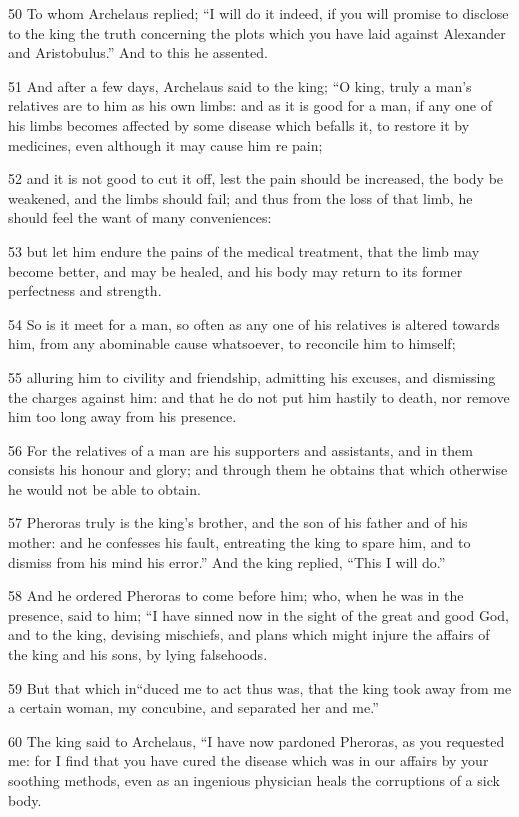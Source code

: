 50 To whom Archelaus replied; “I will do it indeed, if you will promise to disclose to the king the truth concerning the plots which you have laid against Alexander and Aristobulus.” And to this he assented.

51 And after a few days, Archelaus said to the king; “O king, truly a man’s relatives are to him as his own limbs: and as it is good for a man, if any one of his limbs becomes affected by some disease which befalls it, to restore it by medicines, even although it may cause him re pain; 

52 and it is not good to cut it off, lest the pain should be increased, the body be weakened, and the limbs should fail; and thus from the loss of that limb, he should feel the want of many conveniences: 

53 but let him endure the pains of the medical treatment, that the limb may become better, and may be healed, and his body may return to its former perfectness and strength. 

54 So is it meet for a man, so often as any one of his relatives is altered towards him, from any abominable cause whatsoever, to reconcile him to himself; 

55 alluring him to civility and friendship, admitting his excuses, and dismissing the charges against him: and that he do not put him hastily to death, nor remove him too long away from his presence. 

56 For the relatives of a man are his supporters and assistants, and in them consists his honour and glory; and through them he obtains that which otherwise he would not be able to obtain. 

57 Pheroras truly is the king’s brother, and the son of his father and of his mother: and he confesses his fault, entreating the king to spare him, and to dismiss from his mind his error.” And the king replied, “This I will do.” 

58 And he ordered Pheroras to come before him; who, when he was in the presence, said to him; “I have sinned now in the sight of the great and good God, and to the king, devising mischiefs, and plans which might injure the affairs of the king and his sons, by lying falsehoods. 

59 But that which in“duced me to act thus was, that the king took away from me a certain woman, my concubine, and separated her and me.” 

60 The king said to Archelaus, “I have now pardoned Pheroras, as you requested me: for I find that you have cured the disease which was in our affairs by your soothing methods, even as an ingenious physician heals the corruptions of a sick body. 

